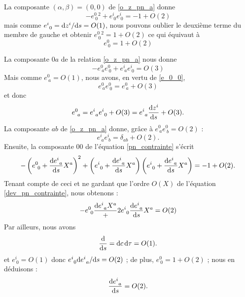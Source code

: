 			La composante $(\alpha,\beta)=(0,0)$ de \ref{o_z_pn_a} donne 
			\begin{equation}
				-e^0_{\ 0}^2 + e^i_{\ 0}e^i_{\ 0} = -1 + O(2)	
			\end{equation}
			mais comme $e^i_{\ 0}=\mathrm{d} z^i / \mathrm{d} s = O(1)$, nous pouvons oublier le deuxième terme du membre de gauche et obtenir $e^0_{\ 0}^2=1+O(2)$ ce qui équivaut à 
			\begin{equation}\label{e_0_0}
				e^0_{\ 0}=1+O(2)	
			\end{equation}

			La composante $0a$ de la relation \ref{o_z_pn_a} nous donne
			\begin{equation}
				-e^0_{\ a}e^0_{\ 0}+e^i_{\ a}e^i_{\ 0}=O(3)
			\end{equation}
			Mais comme $e^0_{\ a}=O(1)$, nous avons, en vertu de \ref{e_0_0},
			\begin{equation}
				e^0_{\ a}e^0_{\ 0}=e^0_{\ a}+O(3)
			\end{equation}
			et donc
			\begin{equation}
				e^0_{\ a}=e^i_{\ a}e^i_{\ 0}+O(3)=e^i_{\ a}\frac{\d z^i}{\d s} + O(3).
			\end{equation}
			La composante $ab$ de \ref{o_z_pn_a} donne, grâce à $e^0_{\ a}e^0_{\ b}=O(2)$ :
			\begin{equation}
				e^i_{\ a}e^i_{\ b}=\delta_{ab}+O(2).
			\end{equation}
			Ensuite, la composante $00$ de l'équation  \ref{pn_contrainte} s'écrit
			\begin{equation}\label{dev_pn_contrainte}
				-\left(e^0_{\ 0}+ \frac{\mathrm{d} e^i_{\ a}}{\mathrm{d} s} X^a \right)^2 + \left( e^i_{\ 0} + \frac{\mathrm{d} e^i_{\ a}}{\mathrm{d} s} X^a \right)\left( e^i_{\ 0} + \frac{\mathrm{d} e^i_{\ a}}{\mathrm{d} s} X^a \right)=-1+O(2).
			\end{equation}
			Tenant compte de ceci et ne gardant que l'ordre $O(X)$ de l'équation \ref{dev_pn_contrainte}, nous obtenons :
			\begin{equation}
				-e^0_{\ 0}\frac{\mathrm{d} e^i_{\ a}X^a} + 2 e^i_{\ 0}\frac{\mathrm{d} e^i_{\ a}}{\mathrm{d} s}X^a=O(2)
			\end{equation}
			Par ailleurs, nous avons
			\begin{equation}
				\frac{\mathrm{d}}{\mathrm{d} s}={\mathrm{d}}{c\, \mathrm{d} \tau}=O(1).
			\end{equation}
			et $e^i_{\ 0}=O(1)$ donc $e^i_{\ 0}\mathrm{d} e^i_{\ a}/\mathrm{d} s=O(2)$ ; de plus, $e^0_{\ 0}=1+O(2)$ ; nous en déduisons :
			\begin{equation}
				\frac{\d e^i_{\ a}}{\d s}=O(2).
			\end{equation}





